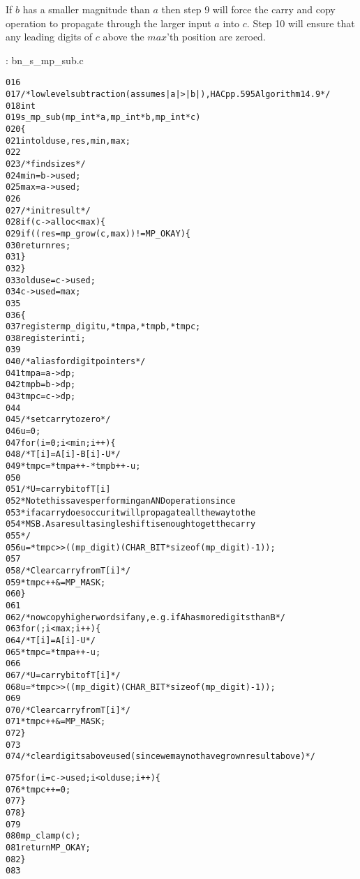 \documentclass[b5paper]{book}
\begin{document}
If $b$ has a smaller magnitude than $a$ then step 9 will force the carry and copy operation to propagate through the larger input $a$ into $c$.  Step
10 will ensure that any leading digits of $c$ above the $max$'th position are zeroed.

\vspace{+3mm}\begin{small}
\hspace{-5.1mm}{\bf File}: bn\_s\_mp\_sub.c
\vspace{-3mm}
\begin{alltt}
016   
017   /* low level subtraction (assumes |a| > |b|), HAC pp.595 Algorithm 14.9 */
018   int
019   s_mp_sub (mp_int * a, mp_int * b, mp_int * c)
020   \{
021     int     olduse, res, min, max;
022   
023     /* find sizes */
024     min = b->used;
025     max = a->used;
026   
027     /* init result */
028     if (c->alloc < max) \{
029       if ((res = mp_grow (c, max)) != MP_OKAY) \{
030         return res;
031       \}
032     \}
033     olduse = c->used;
034     c->used = max;
035   
036     \{
037       register mp_digit u, *tmpa, *tmpb, *tmpc;
038       register int i;
039   
040       /* alias for digit pointers */
041       tmpa = a->dp;
042       tmpb = b->dp;
043       tmpc = c->dp;
044   
045       /* set carry to zero */
046       u = 0;
047       for (i = 0; i < min; i++) \{
048         /* T[i] = A[i] - B[i] - U */
049         *tmpc = *tmpa++ - *tmpb++ - u;
050   
051         /* U = carry bit of T[i]
052          * Note this saves performing an AND operation since
053          * if a carry does occur it will propagate all the way to the
054          * MSB.  As a result a single shift is enough to get the carry
055          */
056         u = *tmpc >> ((mp_digit)(CHAR_BIT * sizeof (mp_digit) - 1));
057   
058         /* Clear carry from T[i] */
059         *tmpc++ &= MP_MASK;
060       \}
061   
062       /* now copy higher words if any, e.g. if A has more digits than B  */
063       for (; i < max; i++) \{
064         /* T[i] = A[i] - U */
065         *tmpc = *tmpa++ - u;
066   
067         /* U = carry bit of T[i] */
068         u = *tmpc >> ((mp_digit)(CHAR_BIT * sizeof (mp_digit) - 1));
069   
070         /* Clear carry from T[i] */
071         *tmpc++ &= MP_MASK;
072       \}
073   
074       /* clear digits above used (since we may not have grown result above) */
      
075       for (i = c->used; i < olduse; i++) \{
076         *tmpc++ = 0;
077       \}
078     \}
079   
080     mp_clamp (c);
081     return MP_OKAY;
082   \}
083   
\end{alltt}
\end{small}
\end{document}
